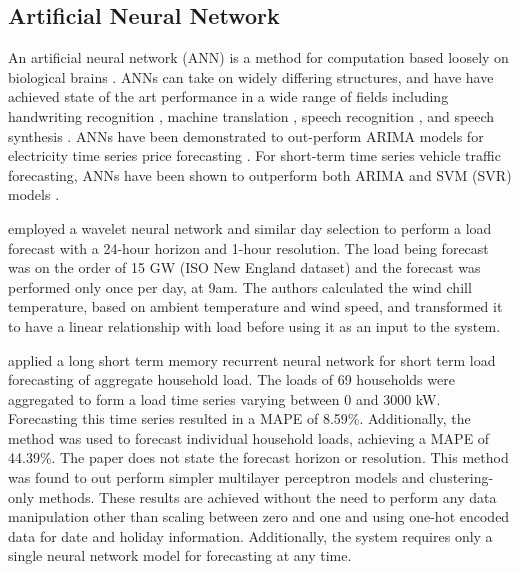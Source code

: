 \subsection{Artificial Neural Network}
An artificial neural network (ANN) is a method for computation based loosely on biological brains \citep{negnevitsky2005artificial}.
ANNs can take on widely differing structures, and have have achieved state of the art performance in a wide range of fields including handwriting recognition \citep{2017arXiv171009829S}, machine translation \citep{Vaswani2017}, speech recognition \citep{Chiu2017}, and speech synthesis \citep{DBLP:journals/corr/OordDZSVGKSK16}.
ANNs have been demonstrated to out-perform ARIMA models for electricity time series price forecasting \citep{Mandal2010}.
For short-term time series vehicle traffic forecasting, ANNs have been shown to outperform both ARIMA and SVM (SVR) models \cite{Zhao2017}.

\citet{Chen2010} employed a wavelet neural network and similar day selection to perform a load forecast with a 24-hour horizon and 1-hour resolution.
The load being forecast was on the order of 15 GW (ISO New England dataset) and the forecast was performed only once per day, at 9am.
The authors calculated the wind chill temperature, based on ambient temperature and wind speed, and transformed it to have a linear relationship with load before using it as an input to the system.

\citet{Kong2017}\cite{Kong2018} applied a long short term memory recurrent neural network for short term load forecasting of aggregate household load.
The loads of 69 households were aggregated to form a load time series varying between 0 and 3000 kW.
Forecasting this time series resulted in a MAPE of 8.59\%.
Additionally, the method was used to forecast individual household loads, achieving a MAPE of 44.39\%.
The paper does not state the forecast horizon or resolution.
This method was found to out perform simpler multilayer perceptron models and clustering-only methods.
These results are achieved without the need to perform any data manipulation other than scaling between zero and one and using one-hot encoded data for date and holiday information.
Additionally, the system requires only a single neural network model for forecasting at any time.

